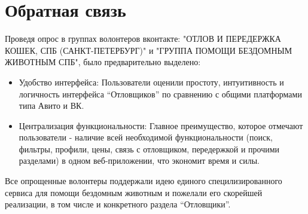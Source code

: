 
\section{Обратная связь}
Проведя опрос в группах волонтеров вконтакте: "ОТЛОВ И ПЕРЕДЕРЖКА КОШЕК, СПБ (САНКТ-ПЕТЕРБУРГ)" и "ГРУППА ПОМОЩИ БЕЗДОМНЫМ ЖИВОТНЫМ СПБ",
было предварительно выделено:
\begin{itemize}
    \item Удобство интерфейса: Пользователи оценили простоту, интуитивность и логичность интерфейса “Отловщиков” по сравнению
     с общими платформами типа Авито и ВК.
    \item Централизация функциональности: Главное преимущество, которое отмечают пользователи - наличие всей необходимой функциональности
     (поиск, фильтры, профили,  цены, связь с отловщиком, передержкой и прочими разделами) в одном веб-приложении, что экономит время и силы.
\end{itemize}

  Все опрощенные волонтеры поддержали идею единого специлизированного сервиса для помощи бездомным животным и пожелали его
  скорейшей реализации, в том числе и конкретного раздела \enquote{Отловщики}.
